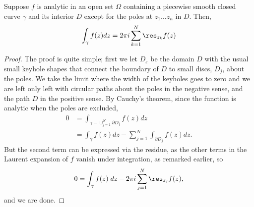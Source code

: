 \begin{thm}
    Suppose $f$ is analytic in an open set $\Omega$ containing a piecewise smooth closed curve $\gamma$ and its interior $D$ except for the poles at $z_1\dots z_n$ in $D$.
    Then,
    \begin{equation*}
        \int_\gamma f(z) dz = 2\pi i \sum_{k=1}^N \res_{z_k} f(z)
    \end{equation*}
\end{thm}
\begin{proof}
    The proof is quite simple; first we let $D_\varepsilon$ be the domain $D$ with the usual small keyhole shapes that connect the boundary of $D$ to small discs, $D_j$, about
    the poles. We take the limit where the width of the keyholes goes to zero and we are left only left with circular paths about the poles in the negative sense, and the
    path $D$ in the positive sense. By Cauchy's theorem, since the function is analytic when the poles are excluded,
    \begin{align*}
        0&=\int_{\gamma-\cup_{j=1}^N\partial D_j} f(z) dz\\
        &=\int_\gamma f(z) dz - \sum_{j=1}^N \int_{\partial D_j} f(z) dz.
    \end{align*}
    But the second term can be expressed via the residue, as the other terms in the Laurent expansion of $f$ vanish under integration, as remarked earlier, so
    \begin{align*}
        0=\int_\gamma f(z) \; dz - 2\pi i \sum_{j=1}^N \res_{z_j} f(z),
    \end{align*}
    and we are done.
\end{proof}
